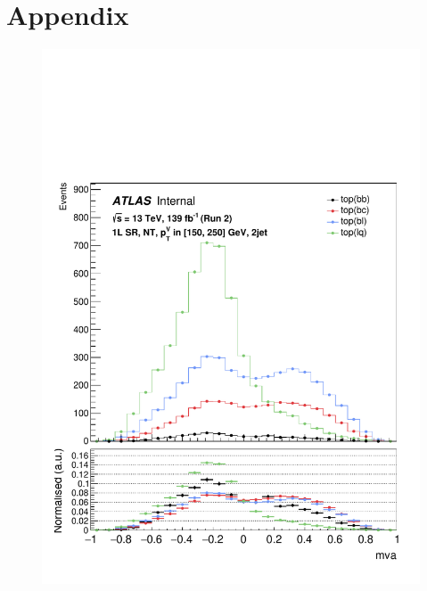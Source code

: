 \section{Appendix}

\begin{figure}[h!]
\center
\includegraphics[scale=0.253]{Images/VH/top/OneLepton_top_1nttag2jet_SR_150_250ptv_mva.pdf}

\end{figure}
